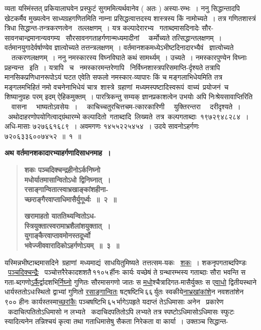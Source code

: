 \documentclass[11pt, openany]{book}
\begin{document}
\noindent व्यता यस्मिंस्तत् प्रकियालाघवेन प्रस्फुटं सुगममित्यर्थवानेव ( अतः ) अस्या-रम्भः~। ननु सिद्धान्तादपि खेटकर्मैव मुख्यत्वेन साध्यग्रहगणितमिति नाम्ना प्रसिद्धत्वात्तदस्य शास्त्रस्य किं नामोच्यते~। तत्र गणितशास्त्रं त्रिधा सिद्धान्त-तन्त्रकरणत्वेन ~तल्लक्षणम्~। यत्र कल्पादेरारभ्य ~गताब्दमासदिनादेः सौर-सावनचान्द्रमानान्यवगम्य ~सौरसावनगताहर्गणान्मध्यमादीनां ~~कर्मोच्यते तत्सिद्धान्तलक्षणम्~। वर्तमानयुगादेर्वर्षाण्येव ज्ञात्वोच्यते तत्तन्त्रलक्षणम्~। वर्तमानशकमध्येऽभीष्टदिनादारभ्यैवं ~ज्ञात्वोच्यते ~~तत्करणलक्षणम्~। ननु नमस्कारस्य विघ्नविघाते कथं सामर्थ्यम्~। उच्यते~। नमस्कारपुण्येन विघ्नाः प्रहन्यन्त ~इति~। यत्रापि ~च ~नमस्कारमन्तरेणापि ~निर्विघ्नशास्त्रपरिसमाप्ति-र्दृश्यते तत्रापि मानसिकप्रणिधानरूपोऽयं घटत एवेति सफलो नमस्कार-व्यापारः किं च मङ्गलाभिधेयमिति तत्र मङ्गलमभिहितं नमो वचनेनाभिधेयं चात्र \,शास्त्रे \,ग्रहाणां \,मध्यमस्पष्टादिस्वरूपं \,वाच्यं \,प्रयोजनं\, च\, शिष्यानुग्रहः परम् इदम् ऐहिकमुक्तम्~। पारत्रिकन्तु सम्यक् ज्ञानप्रकाशत्वेन उभयोः अपि निःश्रेयसावाप्तिरिति ~~वासना ~~भाष्यतोऽवसेयः~। ~~काचिच्चतुरचित्तचम-त्कारकारिणी ~~युक्तिरन्तरा ~~दरीदृश्यते~। ~अथोदाहरणोपयोगित्वाद्ग्रंथारम्भे कल्पादितो \,गताब्दादि \,लिख्यते \,तत्र \,कल्पगताब्दाः \,१९७२९४८२८४~। अधि-मासाः ७२७६६१६८९~। अवमगणः १४५५२२५४५४~। उदये सावनोऽहर्गणः ७२०६३३६००७४५२~॥~१~॥

\newpage

{\small \textbf{अथ वर्तमानशकादारभ्या{ह}र्गणादिसाधनमाह~।}}

 \label{1.2}
\begin{quote}
{\large \textbf{{\color{purple}शकः पञ्चदिक्चन्द्रहीनोऽर्कनिघ्नो\\
मधोर्यातमासान्वितोऽधो द्विनिघ्नात्~।\\
रसाङ्गान्वितात्स्वाभ्रखाङ्कांशहीना-\\
च्छराङ्गैरवाप्ताधिमासैर्युगूर्ध्वः~॥~२~॥}}
\vspace{1mm}

 \label{1.3}
\textbf{{\color{purple}खरामाहतो याततिथ्यन्वितोऽध-\\
स्त्रियुक्तात्स्वरामाभ्रशैलांशयुक्तात्~।\\
युगाङ्कैरवाप्तावमोनस्तदूर्ध्वो\\
भवेज्जीववारादिकोऽहर्गणोऽयम्~॥~३~॥}}}
\end{quote}

यस्मिन्नभीष्टाब्दमासदिने \,ग्रहाणां \,मध्यमाद्यं \,साधयितुमिष्यते \,तत्तत्सम-यकः ~\hyperref[1.2]{शकः}~। शकनृपगताब्दपिण्डः ~\hyperref[1.2]{पञ्चदिक्चन्द्रैः} ~पञ्चोत्तरैरेकादशशतै\textendash \,११०५\textendash \,र्हीनः कार्यः यच्छेषं ते ग्रन्थारम्भस्य गताब्दाः सौरा भवन्ति स गता-ब्दगणो\hyperref[1.2]{ऽर्कै}र्द्वादशभि\hyperref[1.2]{र्निघ्नो} गुणितः सौरमासगणो जातः स \hyperref[1.2]{मधो}श्चैत्रादिगत-मासैर्युक्तः \;स \;ए\hyperref[1.2]{वाधो} \;द्वितीयस्थाने धार्यस्ततोऽधःस्थितो \;द्वाभ्यां \;गुणितो \hyperref[1.2]{रसाङ्गान्वितः} षट्षष्टिभि\textendash \,६६\textendash \,र्युतः स्वकीये\hyperref[1.2]{नाभ्रखांकांशे}न नवशतांशेन ९०० हीनः कार्यस्तस्मा\hyperref[1.2]{च्छरांकैः} पञ्चषष्टिभि\textendash \,६५\textendash \,र्भागेऽपहृते यदाप्तं तेऽधिमासाः अनेन ~प्रकारेण ~कदाचित्पतितोऽधिमासो \;न \;लभ्यते ~कदाचिदपतितोऽपि \;लभ्यते \;तत्र \;स्पष्टोऽधिमासोऽधिमासः \;स्फुटः \;स्यादित्यनेन \;तन्निश्चयं \;कृत्वा तथा गताधिमासेषु सैकता निरेकता वा कार्या~। उक्तञ्च {\color{violet}सिद्धान्त-}
\end{document}
